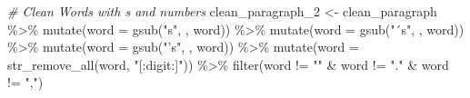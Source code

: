 \documentclass[
]{article}
\newenvironment{Shaded}{\begin{snugshade}}{\end{snugshade}}
\newcommand{\AttributeTok}[1]{\textcolor[rgb]{0.77,0.63,0.00}{#1}}
\newcommand{\CommentTok}[1]{\textcolor[rgb]{0.56,0.35,0.01}{\textit{#1}}}
\newcommand{\FunctionTok}[1]{\textcolor[rgb]{0.00,0.00,0.00}{#1}}
\newcommand{\NormalTok}[1]{#1}
\newcommand{\OtherTok}[1]{\textcolor[rgb]{0.56,0.35,0.01}{#1}}
\newcommand{\SpecialCharTok}[1]{\textcolor[rgb]{0.00,0.00,0.00}{#1}}
\newcommand{\StringTok}[1]{\textcolor[rgb]{0.31,0.60,0.02}{#1}}
\begin{document}
\begin{Shaded}
\begin{Highlighting}[]
\CommentTok{\# Clean Words with \textquotesingle{}s and numbers}
\NormalTok{clean\_paragraph\_2 }\OtherTok{\textless{}{-}}\NormalTok{ clean\_paragraph }\SpecialCharTok{\%\textgreater{}\%}
  \FunctionTok{mutate}\NormalTok{(}\AttributeTok{word =} \FunctionTok{gsub}\NormalTok{(}\StringTok{"\textquotesingle{}s"}\NormalTok{, }\StringTok{\textquotesingle{}\textquotesingle{}}\NormalTok{, word)) }\SpecialCharTok{\%\textgreater{}\%} 
  \FunctionTok{mutate}\NormalTok{(}\AttributeTok{word =} \FunctionTok{gsub}\NormalTok{(}\StringTok{"´s"}\NormalTok{, }\StringTok{\textquotesingle{}\textquotesingle{}}\NormalTok{, word)) }\SpecialCharTok{\%\textgreater{}\%} 
   \FunctionTok{mutate}\NormalTok{(}\AttributeTok{word =} \FunctionTok{gsub}\NormalTok{(}\StringTok{"’s"}\NormalTok{, }\StringTok{\textquotesingle{}\textquotesingle{}}\NormalTok{, word)) }\SpecialCharTok{\%\textgreater{}\%}
  \FunctionTok{mutate}\NormalTok{(}\AttributeTok{word =} \FunctionTok{str\_remove\_all}\NormalTok{(word, }\StringTok{"[:digit:]"}\NormalTok{)) }\SpecialCharTok{\%\textgreater{}\%}
  \FunctionTok{filter}\NormalTok{(word }\SpecialCharTok{!=} \StringTok{""} \SpecialCharTok{\&}\NormalTok{ word }\SpecialCharTok{!=} \StringTok{"."} \SpecialCharTok{\&}\NormalTok{ word }\SpecialCharTok{!=} \StringTok{","}\NormalTok{)}



\end{Highlighting}
\end{Shaded}
\end{document}
